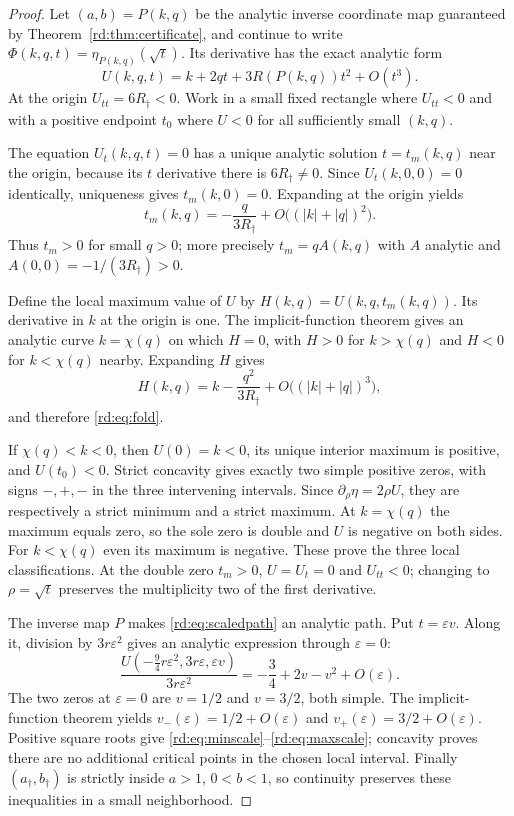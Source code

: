 \begin{proof}
Let $(a,b)=P(k,q)$ be the analytic inverse coordinate map guaranteed
by Theorem~\ref{rd:thm:certificate}, and continue to write
$\Phi(k,q,t)=\eta_{P(k,q)}(\sqrt t)$. Its derivative has the exact
analytic form
\[
 U(k,q,t)=k+2qt+3R(P(k,q))t^2+O(t^3).
\]
At the origin $U_{tt}=6R_\dagger<0$. Work in a small fixed rectangle
where $U_{tt}<0$ and with a positive endpoint $t_0$ where $U<0$
for all sufficiently small $(k,q)$.

The equation $U_t(k,q,t)=0$ has a unique analytic solution
$t=t_m(k,q)$ near the origin, because its $t$ derivative there is
$6R_\dagger\ne0$. Since $U_t(k,0,0)=0$ identically, uniqueness
gives $t_m(k,0)=0$. Expanding at the origin yields
\[
 t_m(k,q)=-\frac{q}{3R_\dagger}
               +O\bigl((|k|+|q|)^2\bigr).
\]
Thus $t_m>0$ for small $q>0$; more precisely $t_m=qA(k,q)$ with
$A$ analytic and $A(0,0)=-1/(3R_\dagger)>0$.

Define the local maximum value of $U$ by
$H(k,q)=U(k,q,t_m(k,q))$. Its derivative in $k$ at the origin is
one. The implicit-function theorem gives an analytic curve
$k=\chi(q)$ on which $H=0$, with $H>0$ for $k>\chi(q)$ and
$H<0$ for $k<\chi(q)$ nearby. Expanding $H$ gives
\[
 H(k,q)=k-\frac{q^2}{3R_\dagger}
                   +O\bigl((|k|+|q|)^3\bigr),
\]
and therefore \eqref{rd:eq:fold}.

If $\chi(q)<k<0$, then $U(0)=k<0$, its unique interior maximum
is positive, and $U(t_0)<0$. Strict concavity gives exactly two
simple positive zeros, with signs $- , + , -$ in the three intervening
intervals. Since $\partial_\rho\eta=2\rho U$, they are respectively
a strict minimum and a strict maximum. At $k=\chi(q)$ the maximum
equals zero, so the sole zero is double and $U$ is negative on both
sides. For $k<\chi(q)$ even its maximum is negative. These prove
the three local classifications. At the double zero $t_m>0$,
$U=U_t=0$ and $U_{tt}<0$; changing to $\rho=\sqrt t$ preserves
the multiplicity two of the first derivative.

The inverse map $P$ makes \eqref{rd:eq:scaledpath} an analytic path.
Put $t=\varepsilon v$. Along it, division by $3r\varepsilon^2$
gives an analytic expression through $\varepsilon=0$:
\[
 \frac{U(-\tfrac94r\varepsilon^2,3r\varepsilon,\varepsilon v)}
      {3r\varepsilon^2}
   =-\frac34+2v-v^2+O(\varepsilon).
\]
The two zeros at $\varepsilon=0$ are $v=1/2$ and $v=3/2$,
both simple. The implicit-function theorem yields
$v_-(\varepsilon)=1/2+O(\varepsilon)$ and
$v_+(\varepsilon)=3/2+O(\varepsilon)$. Positive square roots give
\eqref{rd:eq:minscale}--\eqref{rd:eq:maxscale}; concavity proves there
are no additional critical points in the chosen local interval.
Finally $(a_\dagger,b_\dagger)$ is strictly inside $a>1$, $0<b<1$,
so continuity preserves these inequalities in a small neighborhood.
\end{proof}

